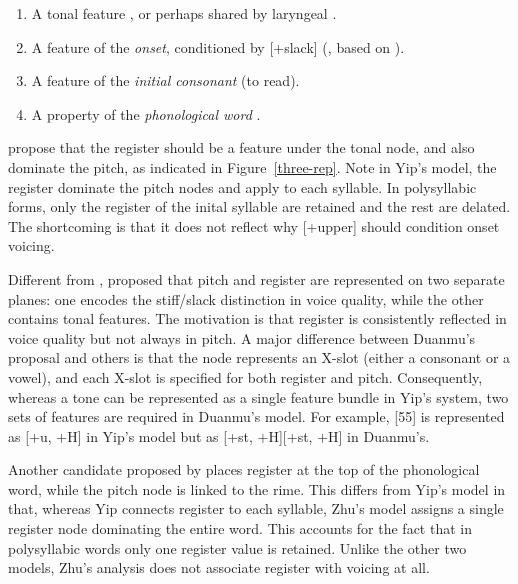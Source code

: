 \documentclass[11pt]{article}
\begin{document}
\begin{enumerate} \setlength\itemsep{0em} \setlength\parskip{0em}
\item A tonal feature \citep{yip1980diss}, or perhaps shared by laryngeal
\citep{yip1993tonal}.
\item A feature of the \textit{onset}, conditioned by [+slack]
(\citeauthor{duanmu1988}, based on \citet{bao1999structure}).
	\item A feature of the \textit{initial consonant} \citep{ren1992} (to read).
	\item A property of the \textit{phonological word} \citep{zhu1999shanghai}.
\end{enumerate}



\citet{yip1980diss,yip1993tonal} propose that the register should be a feature 
under the tonal node, and also dominate the pitch, as indicated in 
Figure~\ref{three-rep}. Note in Yip's model, the register dominate the pitch 
nodes and apply to each syllable. In polysyllabic forms, only the register
of the inital syllable are retained and the rest are delated. The shortcoming
is that it does not reflect why [+upper] should condition onset voicing. 

Different from \citet{yip1980diss,yip1993tonal}, \citet{duanmu1988} proposed 
that pitch and register are represented on two separate planes: one encodes the 
stiff/slack distinction in voice quality, while the other contains tonal 
features. The motivation is that register is consistently reflected in voice 
quality but not always in pitch. A major difference between Duanmu’s proposal 
and others is that the node represents an X-slot (either a consonant or a 
vowel), and each X-slot is specified for both register and pitch. Consequently, 
whereas a tone can be represented as a single feature bundle in Yip’s system, 
two sets of features are required in Duanmu’s model. For example, [55] is 
represented as [+u, +H] in Yip’s model but as [+st, +H][+st, +H] in Duanmu’s.

Another candidate proposed by \citet{zhu1999shanghai} places register at the 
top of the phonological word, while the pitch node is linked to the rime. This 
differs from Yip’s model in that, whereas Yip connects register to each 
syllable, Zhu’s model assigns a single register node dominating the entire 
word. This accounts for the fact that in polysyllabic words only one register 
value is retained. Unlike the other two models, Zhu’s analysis does not 
associate register with voicing at all.
\end{document}
